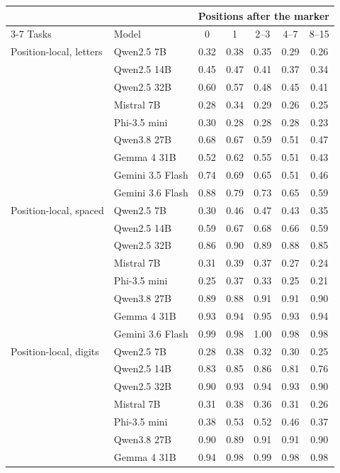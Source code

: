 \begin{tabular}{llccccc}
\toprule
& & \multicolumn{5}{c}{Positions after the marker} \\
\cmidrule(lr){3-7}
Tasks & Model & 0 & 1 & 2--3 & 4--7 & 8--15 \\
\midrule
Position-local, letters & Qwen2.5 7B & 0.32 & 0.38 & 0.35 & 0.29 & 0.26 \\
 & Qwen2.5 14B & 0.45 & 0.47 & 0.41 & 0.37 & 0.34 \\
 & Qwen2.5 32B & 0.60 & 0.57 & 0.48 & 0.45 & 0.41 \\
 & Mistral 7B & 0.28 & 0.34 & 0.29 & 0.26 & 0.25 \\
 & Phi-3.5 mini & 0.30 & 0.28 & 0.28 & 0.28 & 0.23 \\
 & Qwen3.8 27B & 0.68 & 0.67 & 0.59 & 0.51 & 0.47 \\
 & Gemma 4 31B & 0.52 & 0.62 & 0.55 & 0.51 & 0.43 \\
 & Gemini 3.5 Flash & 0.74 & 0.69 & 0.65 & 0.51 & 0.46 \\
 & Gemini 3.6 Flash & 0.88 & 0.79 & 0.73 & 0.65 & 0.59 \\
\midrule
Position-local, spaced & Qwen2.5 7B & 0.30 & 0.46 & 0.47 & 0.43 & 0.35 \\
 & Qwen2.5 14B & 0.59 & 0.67 & 0.68 & 0.66 & 0.59 \\
 & Qwen2.5 32B & 0.86 & 0.90 & 0.89 & 0.88 & 0.85 \\
 & Mistral 7B & 0.31 & 0.39 & 0.37 & 0.27 & 0.24 \\
 & Phi-3.5 mini & 0.25 & 0.37 & 0.33 & 0.25 & 0.21 \\
 & Qwen3.8 27B & 0.89 & 0.88 & 0.91 & 0.91 & 0.90 \\
 & Gemma 4 31B & 0.93 & 0.94 & 0.95 & 0.93 & 0.94 \\
 & Gemini 3.6 Flash & 0.99 & 0.98 & 1.00 & 0.98 & 0.98 \\
\midrule
Position-local, digits & Qwen2.5 7B & 0.28 & 0.38 & 0.32 & 0.30 & 0.25 \\
 & Qwen2.5 14B & 0.83 & 0.85 & 0.86 & 0.81 & 0.76 \\
 & Qwen2.5 32B & 0.90 & 0.93 & 0.94 & 0.93 & 0.90 \\
 & Mistral 7B & 0.31 & 0.38 & 0.36 & 0.31 & 0.26 \\
 & Phi-3.5 mini & 0.38 & 0.53 & 0.52 & 0.46 & 0.37 \\
 & Qwen3.8 27B & 0.90 & 0.89 & 0.91 & 0.91 & 0.90 \\
 & Gemma 4 31B & 0.94 & 0.98 & 0.99 & 0.98 & 0.98 \\

\end{tabular}
